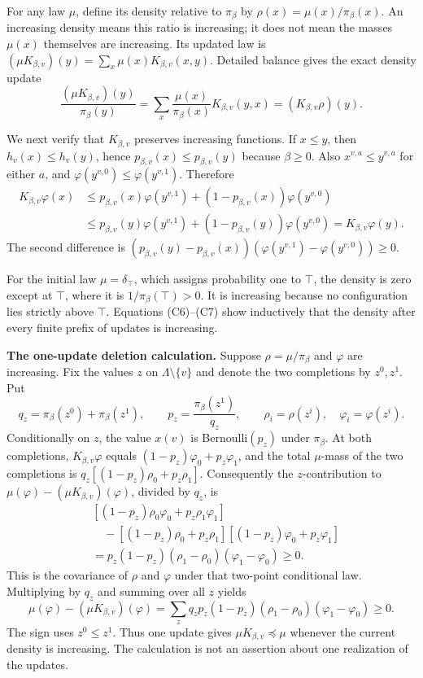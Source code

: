 \documentclass[
  11pt,
  a4paper,
]{article}
\begin{document}
For any law \(\mu\), define its density relative to \(\pi_\beta\) by
\(\rho(x)=\mu(x)/\pi_\beta(x)\). An increasing density means this ratio
is increasing; it does not mean the masses \(\mu(x)\) themselves are
increasing. Its updated law is
\((\mu K_{\beta,v})(y)=\sum_x\mu(x)K_{\beta,v}(x,y)\). Detailed balance
gives the exact density update \[
\frac{(\mu K_{\beta,v})(y)}{\pi_\beta(y)}
=\sum_x\frac{\mu(x)}{\pi_\beta(x)}K_{\beta,v}(y,x)
=(K_{\beta,v}\rho)(y).
\tag{C6}
\]

We next verify that \(K_{\beta,v}\) preserves increasing functions. If
\(x\leq y\), then \(h_v(x)\leq h_v(y)\), hence
\(p_{\beta,v}(x)\leq p_{\beta,v}(y)\) because \(\beta\geq0\). Also
\(x^{v,a}\leq y^{v,a}\) for either \(a\), and
\(\varphi(y^{v,0})\leq\varphi(y^{v,1})\). Therefore \[
\begin{aligned}
K_{\beta,v}\varphi(x)
&\leq p_{\beta,v}(x)\varphi(y^{v,1})
 +(1-p_{\beta,v}(x))\varphi(y^{v,0})\\
&\leq p_{\beta,v}(y)\varphi(y^{v,1})
 +(1-p_{\beta,v}(y))\varphi(y^{v,0})
=K_{\beta,v}\varphi(y).
\end{aligned}
\tag{C7}
\] The second difference is \((p_{\beta,v}(y)-p_{\beta,v}(x))
(\varphi(y^{v,1})-\varphi(y^{v,0}))\geq0\).

For the initial law \(\mu=\delta_\top\), which assigns probability one
to \(\top\), the density is zero except at \(\top\), where it is
\(1/\pi_\beta(\top)>0\). It is increasing because no configuration lies
strictly above \(\top\). Equations (C6)--(C7) show inductively that the
density after every finite prefix of updates is increasing.

\textbf{The one-update deletion calculation.} Suppose
\(\rho=\mu/\pi_\beta\) and \(\varphi\) are increasing. Fix the values
\(z\) on \(\Lambda\setminus\{v\}\) and denote the two completions by
\(z^0,z^1\). Put \[
q_z=\pi_\beta(z^0)+\pi_\beta(z^1),\qquad
p_z=\frac{\pi_\beta(z^1)}{q_z},\qquad
\rho_i=\rho(z^i),\quad \varphi_i=\varphi(z^i).
\] Conditionally on \(z\), the value \(x(v)\) is Bernoulli\((p_z)\)
under \(\pi_\beta\). At both completions, \(K_{\beta,v}\varphi\) equals
\((1-p_z)\varphi_0+p_z\varphi_1\), and the total \(\mu\)-mass of the two
completions is \(q_z[(1-p_z)\rho_0+p_z\rho_1]\). Consequently the
\(z\)-contribution to \(\mu(\varphi)-(\mu K_{\beta,v})(\varphi)\),
divided by \(q_z\), is \[
\begin{aligned}
&[(1-p_z)\rho_0\varphi_0+p_z\rho_1\varphi_1]\\
&\quad-[(1-p_z)\rho_0+p_z\rho_1]
       [(1-p_z)\varphi_0+p_z\varphi_1]\\
&=p_z(1-p_z)(\rho_1-\rho_0)(\varphi_1-\varphi_0)\geq0.
\end{aligned}
\tag{C8}
\] This is the covariance of \(\rho\) and \(\varphi\) under that
two-point conditional law. Multiplying by \(q_z\) and summing over all
\(z\) yields \[
\mu(\varphi)-(\mu K_{\beta,v})(\varphi)
=\sum_zq_zp_z(1-p_z)(\rho_1-\rho_0)(\varphi_1-\varphi_0)\geq0.
\tag{C9}
\] The sign uses \(z^0\leq z^1\). Thus one update gives
\(\mu K_{\beta,v}\preceq\mu\) whenever the current density is
increasing. The calculation is not an assertion about one realization of
the updates.
\end{document}
